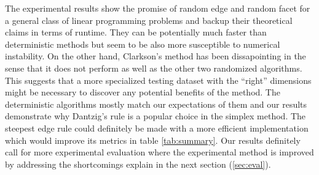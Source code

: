 \documentclass{standalone}
\begin{document}
  The experimental results show the promise of random edge and random facet for a general class of linear programming problems and backup their theoretical claims in terms of runtime. They can be potentially much faster than deterministic methods but seem to be also more susceptible to numerical instability. On the other hand, Clarkson's method has been dissapointing in the sense that it does not perform as well as the other two randomized algorithms. This suggests that a more specialized testing dataset with the ``right'' dimensions might be necessary to discover any potential benefits of the method. The deterministic algorithms mostly match our expectations of them and our results demonstrate why Dantzig's rule is a popular choice in the simplex method. The steepest edge rule could definitely be made with a more efficient implementation which would improve its metrics in table \ref{tab:summary}. Our results definitely call for more experimental evaluation where the experimental method is improved by addressing the shortcomings explain in the next section (\ref{sec:eval}).
\end{document}
